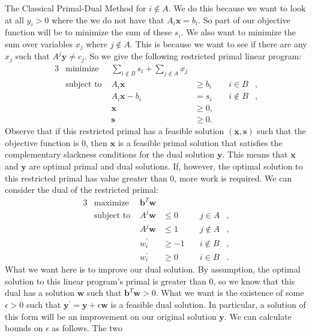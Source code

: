 \documentclass[11pt]{article}
\renewcommand{\'}{^{'}}
\begin{document}
\begin{section}{The Classical Primal-Dual Method}
	for $i\notin A$. We do this because we want to look at all $y_i > 0$ where the we do not 
	have that $A_i\mathbf{x} = b_i$. So part of our objective function will be to minimize the 
	sum of these $s_i$. We also want to minimize the sum over variables $x_j$ where $j\notin A$. 
	This is because we want to see if there are any $x_j$ such that $A^{j}\mathbf{y} \neq c_j$. 
	So we give the following restricted primal linear program:
	\begin{alignat}{3}
		& \text{minimize } & \sum_{i\notin B} s_i + \sum_{j\notin A} x_j & \\
		& \text{subject to } & A_i\mathbf{x} & \geq b_i & \quad i\in B &, \\
				     && A_i\mathbf{x} - b_i & = s_i & \quad i\notin B &, \\
				     && \mathbf{x} & \geq 0, \\
				     && \mathbf{s} & \geq 0.
	\end{alignat}
	Observe that if this restricted primal has a feasible solution $(\mathbf{x},\mathbf{s})$ such 
	that the objective function is 0, then $\mathbf{x}$ is a feasible primal solution that 
	satisfies the complementary slackness conditions for the dual solution $\mathbf{y}$. This 
	means that $\mathbf{x}$ and $\mathbf{y}$ are optimal primal and dual solutions. If, however, 
	the optimal solution to this restricted primal has value greater than 0, more work is required. 
	We can consider the dual of the restricted primal:
	\begin{alignat}{3}
		& \text{maximize } & \mathbf{b}^{T}\mathbf{w} & \\
		& \text{subject to } & A^{j}\mathbf{w} & \leq 0 & \quad j\in A &, \\
				     && A^{j}\mathbf{w} & \leq 1 & \quad j\notin A &, \\
				     && w_i\' & \geq -1 & \quad i\notin B &, \\
				     && w_i\' & \geq 0 & \quad i\in B &.
	\end{alignat}
	What we want here is to improve our dual solution. By assumption, the optimal solution to this 
	linear program's primal is greater than 0, so we know that this dual has a solution 
	$\mathbf{w}$ such that $\mathbf{b}^{T}\mathbf{w} > 0$. What we want is the existence of 
	some $\epsilon > 0$ such that $\mathbf{y}^{'} = \mathbf{y} + \epsilon \mathbf{w}$ is a 
	feasible dual solution. In particular, a solution of this form will be an improvement on our 
	original solution $\mathbf{y}$. We can calculate bounds on $\epsilon$ as follows. The two 

\end{section}
\end{document}
